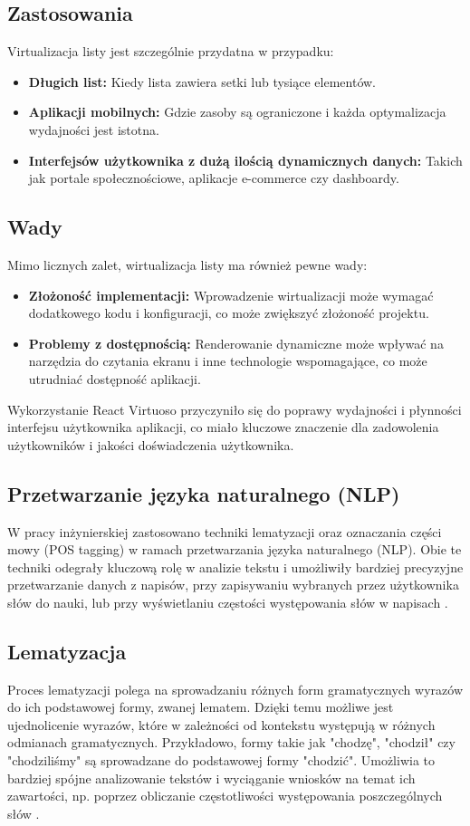 \subsection*{Zastosowania}
Virtualizacja listy jest szczególnie przydatna w przypadku:
\begin{itemize}
    \item \textbf{Długich list:} Kiedy lista zawiera setki lub tysiące elementów.
    \item \textbf{Aplikacji mobilnych:} Gdzie zasoby są ograniczone i każda optymalizacja wydajności jest istotna.
    \item \textbf{Interfejsów użytkownika z dużą ilością dynamicznych danych:} Takich jak portale społecznościowe, aplikacje e-commerce czy dashboardy.
\end{itemize}

\subsection*{Wady}
Mimo licznych zalet, wirtualizacja listy ma również pewne wady:
\begin{itemize}
    \item \textbf{Złożoność implementacji:} Wprowadzenie wirtualizacji może wymagać dodatkowego kodu i konfiguracji, co może zwiększyć złożoność projektu.
    \item \textbf{Problemy z dostępnością:} Renderowanie dynamiczne może wpływać na narzędzia do czytania ekranu i inne technologie wspomagające, co może utrudniać dostępność aplikacji.
\end{itemize}

Wykorzystanie React Virtuoso przyczyniło się do poprawy wydajności i płynności interfejsu użytkownika  aplikacji, co miało kluczowe znaczenie dla zadowolenia użytkowników i jakości doświadczenia użytkownika.

\subsection{Przetwarzanie języka naturalnego (NLP)}
W pracy inżynierskiej zastosowano techniki lematyzacji oraz oznaczania części mowy (POS tagging) w ramach przetwarzania języka naturalnego (NLP). Obie te techniki odegrały kluczową rolę w analizie tekstu i umożliwiły bardziej precyzyjne przetwarzanie danych z napisów, przy zapisywaniu wybranych przez użytkownika słów do nauki, lub przy wyświetlaniu częstości występowania słów w napisach \cite{NLPforNLP}.

\subsection*{Lematyzacja}
Proces lematyzacji polega na sprowadzaniu różnych form gramatycznych wyrazów do ich podstawowej formy, zwanej lematem. Dzięki temu możliwe jest ujednolicenie wyrazów, które w zależności od kontekstu występują w różnych odmianach gramatycznych. Przykładowo, formy takie jak "chodzę", "chodził" czy "chodziliśmy" są sprowadzane do podstawowej formy "chodzić". Umożliwia to bardziej spójne analizowanie tekstów i wyciąganie wniosków na temat ich zawartości, np. poprzez obliczanie częstotliwości występowania poszczególnych słów \cite{NLPforNLP}.

